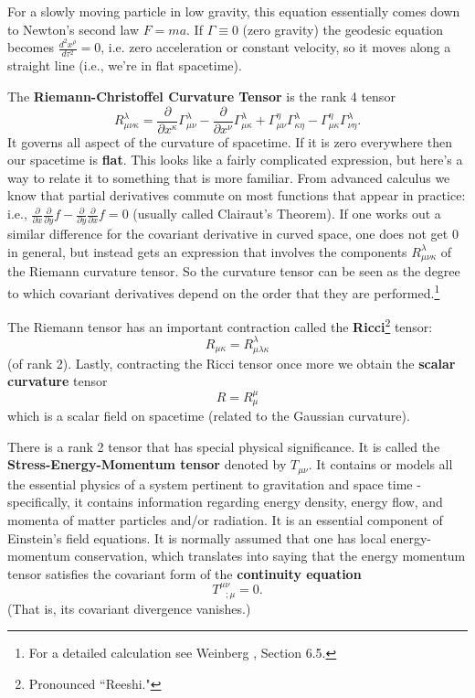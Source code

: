 \documentclass[12pt,reqno]{amsart}
\theoremstyle{definition}
\def\ccite#1{\textcolor{red}{\cite{#1}}}
\numberwithin{equation}{section}
\begin{document}
\medskip

For a slowly moving particle in low gravity, this equation essentially comes down to Newton's second law $F = ma$. If $\Gamma \equiv 0$ (zero gravity) the geodesic equation becomes $\frac{d^2 x^\rho}{d\tau^2} = 0$, i.e. zero acceleration or constant velocity, so it moves along a straight line (i.e., we're in flat spacetime).

\medskip

\noindent The {\bf Riemann-Christoffel Curvature Tensor} is the rank 4 tensor 
\[
R^\lambda_{\mu\nu\kappa} = 
\frac{\partial }{\partial x^\kappa} \Gamma^{\lambda}_{\mu\nu}
- \frac{\partial }{\partial x^\nu} \Gamma^{\lambda}_{\mu\kappa} 
+ \Gamma^{\eta}_{\mu\nu} \Gamma^{\lambda}_{\kappa\eta}
- \Gamma^{\eta}_{\mu\kappa} \Gamma^{\lambda}_{\nu\eta}.
\]
It governs all aspect of the curvature of spacetime. If it is zero everywhere then our spacetime is {\bf flat}. This looks like a fairly complicated expression, but here's a way to relate it to something that is more familiar. From advanced calculus we know that partial derivatives commute on most functions that appear in practice: i.e., 
$\frac{\partial }{\partial x} \frac{\partial }{\partial y} f - 
\frac{\partial }{\partial y} \frac{\partial }{\partial x} f = 0$ (usually called Clairaut's Theorem). If one works out a similar difference for the covariant derivative in curved space, one does not get 0 in general, but instead gets an expression that involves the components $R^\lambda_{\mu\nu\kappa}$ of the Riemann curvature tensor. So the curvature tensor can be seen as the degree to which covariant derivatives depend on the order that they are performed.\footnote{For a detailed calculation see Weinberg \ccite{Weinberg2}, Section 6.5.}

The Riemann tensor has an important contraction called the {\bf Ricci}\footnote{Pronounced ``Reeshi."} tensor: 
$$R_{\mu\kappa} = R^\lambda_{\mu\lambda\kappa}$$
(of rank 2).  Lastly, contracting the Ricci tensor once more we obtain the {\bf scalar curvature} tensor
\[
R = R^\mu_{\mu}
\]
which is a scalar field on spacetime (related to the Gaussian curvature).

There is a rank 2 tensor that has special physical significance. It is called 
the {\bf Stress-Energy-Momentum tensor} denoted by $T_{\mu\nu}$.  It contains or models all the essential physics of a system pertinent to gravitation and space time  - specifically, it contains information regarding energy density, energy flow, and momenta of matter particles and/or radiation. It is an essential component of Einstein's field equations. It is normally assumed that one has local energy-momentum conservation, which translates into saying that the energy momentum tensor satisfies the covariant form of the {\bf continuity equation} 
\[
T^{\mu\nu}_{\ \ \ ;\mu} = 0.
\]
(That is, its covariant divergence vanishes.)
\end{document}
